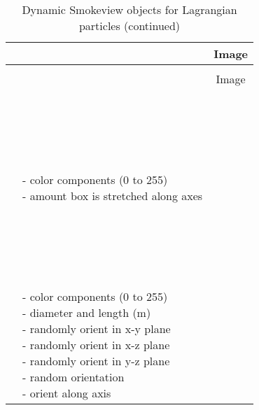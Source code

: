 \begin{longtable}[ht]{|l|l|c|}
\caption{Dynamic Smokeview objects for Lagrangian particles}
\label{tab:devices_dynamic2}
\\ \hline
\ct{SMOKEVIEW_ID}  & \ct{SMOKEVIEW_PARAMETERS} & Image  \\ \hline \hline
\endfirsthead
\caption{Dynamic Smokeview objects for Lagrangian particles (continued)}
\\ \hline
\ct{SMOKEVIEW_ID}  & \ct{SMOKEVIEW_PARAMETERS} & Image  \\ \hline \hline
\endhead

\ct{box} &
\parbox[c]{\boxwidth}{
\hspace{1in} \\
\\
\\
\\  \\
 - color components (0 to 255) \\
 - amount box is stretched along axes \\
\hspace{1in}
} &
 \\ \hline

 &
\parbox[c]{\boxwidth}{
\hspace{1in} \\
\\
\\
\\ \\
 - color components (0 to 255) \\
 - diameter and length (m) \\
 - randomly orient in x-y plane \\
 - randomly orient in x-z plane \\
 - randomly orient in y-z plane \\
 - random orientation \\
 - orient along axis \\
\hspace{1in}
} &
 \\ \hline


\end{longtable}
